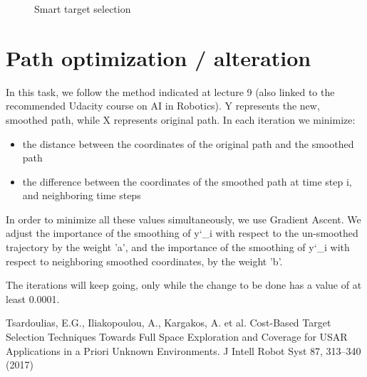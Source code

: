 \documentclass[letterpaper,12pt]{article}
\begin{document}
\begin{figure}[!htb]
\begin{minipage}[b]{0.45\textwidth}
		\caption{Smart target selection}
		\label{fig:smart_target}
	\end{minipage}
\end{figure}

\section{Path optimization / alteration}


\vspace{2mm} %

In this task, we follow the method indicated at lecture 9 (also linked to the recommended Udacity course on AI in Robotics). Y represents the new, smoothed path, while X represents original path. In each iteration we minimize:

\begin{itemize}
	\item the distance between the coordinates of the original path and the smoothed path
	\item the difference between the coordinates of the smoothed path at time step i, and neighboring time steps
\end{itemize}

In order to minimize all these values simultaneously, we use Gradient Ascent. We adjust the importance of the smoothing of y\char`_i with respect to the un-smoothed trajectory by the weight 'a', and the importance of the smoothing of y\char`_i with respect to neighboring smoothed coordinates, by the weight 'b'.

The iterations will keep going, only while the change to be done has a value of at least 0.0001.



\newpage

\begin{thebibliography}{99}
	
	Tsardoulias, E.G., Iliakopoulou, A., Kargakos, A. et al. Cost-Based Target Selection Techniques Towards Full Space Exploration and Coverage for USAR Applications in a Priori Unknown Environments. J Intell Robot Syst 87, 313–340 (2017)
	
	
\end{thebibliography}
\end{document}
